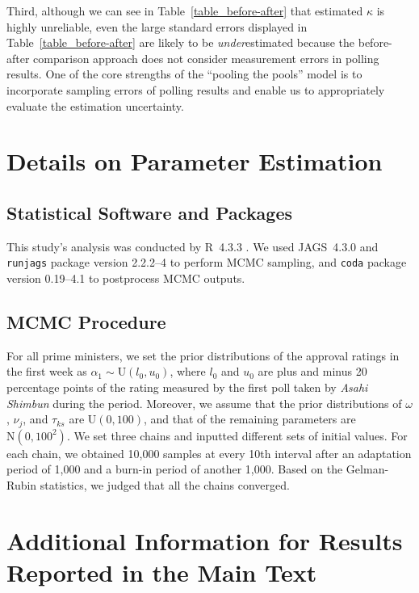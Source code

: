 \documentclass[12pt,letterpaper]{scrartcl}
\begin{document}
Third, although we can see in Table~\ref{table_before-after} that estimated $\kappa $ is highly unreliable, even the large standard errors displayed in Table~\ref{table_before-after} are likely to be \emph{under}estimated because the before-after comparison approach does not consider measurement errors in polling results. One of the core strengths of the ``pooling the pools'' model is to incorporate sampling errors of polling results and enable us to appropriately evaluate the estimation uncertainty.

\section{Details on Parameter Estimation}\label{app:sec:estimation}

\subsection{Statistical Software and Packages}

This study's analysis was conducted by R~4.3.3 \citep{R2024}. We used JAGS~4.3.0 \citep{Plummer2017} and \texttt{runjags} package version 2.2.2--4 \citep{Denwood2016JStatSoftware} to perform MCMC sampling, and \texttt{coda} package version 0.19--4.1 \citep{Plummer2006RNews} to postprocess MCMC outputs.

\subsection{MCMC Procedure}\label{app:subsec:mcmc}

For all prime ministers, we set the prior distributions of the approval ratings in the first week as $\alpha _{1}\sim \mathrm{U}(l_{0},u_{0})$, where $l_{0}$ and $u_{0}$ are plus and minus 20 percentage points of the rating measured by the first poll taken by \emph{Asahi Shimbun} during the period. Moreover, we assume that the prior distributions of $\omega $, $\nu _{j}$, and $\tau _{ks}$ are $\mathrm{U}(0,100)$, and that of the remaining parameters are $\mathrm{N}(0,100^{2})$. We set three chains and inputted different sets of initial values. For each chain, we obtained 10,000 samples at every 10th interval after an adaptation period of 1,000 and a burn-in period of another 1,000. Based on the Gelman-Rubin statistics, we judged that all the chains converged.

\bigskip
\singlespacing
\section{Additional Information for Results Reported in the Main Text}\label{app:sec:misc_cabinet}
\doublespacing
\end{document}
